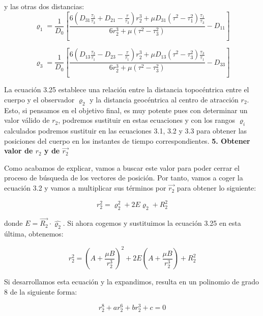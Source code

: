 \documentclass{article}
\numberwithin{equation}{section}
\begin{document}
y las otras dos distancias:
\begin{equation}
\varrho_1 = \frac{1}{D_0} \left[ \frac{6 \left( D_{31} \frac{\tau_1}{\tau_3} + D_{21} - \frac{\tau}{\tau_3} \right) r_2^3 + \mu D_{31} (\tau^2 - \tau_1^2) \frac{\tau_1}{\tau_3}}{6r_2^3 + \mu (\tau^2 - \tau_3^2)} - D_{11} \right]
\end{equation}

\begin{equation}
\varrho_3 = \frac{1}{D_0} \left[ \frac{6 \left( D_{13} \frac{\tau_3}{\tau_1} - D_{23} - \frac{\tau}{\tau_1} \right) r_2^3 + \mu D_{13} (\tau^2 - \tau_3^2) \frac{\tau_3}{\tau_1}}{6r_2^3 + \mu (\tau^2 - \tau_3^2)} - D_{33} \right]
\end{equation}

La ecuación 3.25 establece una relación entre la distancia topocéntrica entre el cuerpo y el observador $\varrho_2$ y la distancia geocéntrica al centro de atracción $r_2$. Esto, si pensamos en el objetivo final, es muy potente pues con determinar un valor válido de $r_2$, podremos sustituir en estas ecuaciones y con los rangos $\varrho_i$ calculados podremos sustituir en las ecuaciones 3.1, 3.2 y 3.3 para obtener las posiciones del cuerpo en los instantes de tiempo correspondientes.
\newpage
\noindent\textbf{5. Obtener valor de $r_2$ y de $\overrightarrow{r_2}$}

Como acabamos de explicar, vamos a buscar este valor para poder cerrar el proceso de búsqueda de los vectores de posición. Por tanto, vamos a coger la ecuación 3.2 y vamos a multiplicar sus términos por $\overrightarrow{r_2}$ para obtener lo siguiente:

\begin{equation}
r_2^2 = \varrho_2^2 + 2E \varrho_2 + R_2^2
\end{equation}

donde $E=\overrightarrow{R_{2}}\cdot\hat{\varrho_{2}}$. Si ahora cogemos y sustituimos la ecuación 3.25 en esta última, obtenemos: 

\begin{equation}
    r_2^2 = \left( A + \frac{\mu B}{r_2^3} \right)^2 + 2E \left( A + \frac{\mu B}{r_2^3} \right) + R_2^2
\end{equation}

Si desarrollamos esta ecuación y la expandimos, resulta en un polinomio de grado 8 de la siguiente forma: 

\begin{equation}
    r_2^8 + ar_2^6 + br_2^3 + c = 0
\end{equation}
\end{document}
